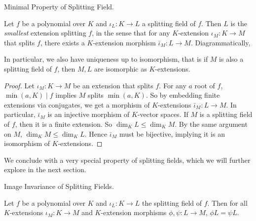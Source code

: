 \documentclass[../book.tex]{subfiles}
\begin{document}
\begin{thm} Minimal Property of Splitting Field. 
    
    Let $f$ be a polynomial over $K$ and 
    $\iota_L : K \to L$ a splitting field of $f$.
    Then $L$ is the \emph{smallest} extension splitting $f$, in the sense that 
    for any $K$-extension $\iota_M : K \to M$ that splits $f$, 
    there exists a $K$-extension morphism $\bar\iota_M : L \to M$. 
    Diagrammatically, 
    \begin{figure}[H]
        \centering
    \end{figure}
    In particular, we also have uniqueness up to isomorphism, that is
    if $M$ is also a splitting field of $f$, 
    then $M,L$ are isomorphic as $K$-extensions.
    
\end{thm}
\begin{proof}
    Let $\iota_M : K \to M$ be an extension that splits $f$. 
    For any $a$ root of $f$, $\min(a,K) \mid f$ implies $M$ splits $\min(a,K)$.
    So by embedding finite extensions via conjugates,
    we get a morphism of $K$-extensions $\bar\iota_M : L \to M$. 
    In particular, $\bar\iota_M$ is an injective morphism of $K$-vector spaces.
    If $M$ is a splitting field of $f$, then it is a finite extension.
    So $\dim_K L \leq \dim_K M$. 
    By the same argument on $M$, $\dim_K M \leq \dim_K L$.
    Hence $\bar\iota_M$ must be bijective,
    implying it is an isomorphism of $K$-extensions. 
\end{proof}
\begin{rmk}
    We conclude with a very special property of splitting fields,
    which we will further explore in the next section. 
\end{rmk}
\begin{thm} Image Invariance of Splitting Fields. 
    
    Let $f$ be a polynomial over $K$ and 
    $\iota_L : K \to L$ the splitting field of $f$.
    Then for all $K$-extensions $\iota_M : K \to M$ and
    $K$-extension morphisms $\phi, \psi : L \to M$, $\phi L = \psi L$. 
\end{thm}
\end{document}
